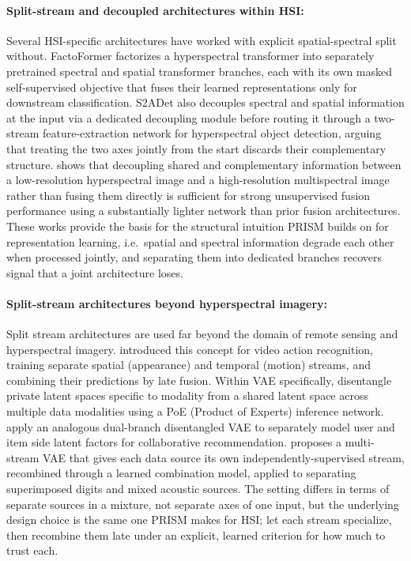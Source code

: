 \documentclass[twoside,11pt]{article}
\begin{document}
\paragraph{Split-stream and decoupled architectures within HSI:}
Several HSI-specific architectures have worked with explicit spatial-spectral split without. FactoFormer \citep{mohamed2023factoformer} factorizes a hyperspectral transformer into separately pretrained spectral and spatial transformer branches, each with its own masked self-supervised objective that fuses their learned representations only for downstream classification. S2ADet \citep{he2023s2adet} also decouples spectral and spatial information at the input via a dedicated decoupling module before routing it through a two-stream feature-extraction network for hyperspectral object detection, arguing that treating the two axes jointly from the start discards their complementary structure. \citet{du2024modality} shows that decoupling shared and complementary information between a low-resolution hyperspectral image and a high-resolution multispectral image rather than fusing them directly is sufficient for strong unsupervised fusion performance using a substantially lighter network than prior fusion architectures. These works provide the basis for the structural intuition PRISM builds on for representation learning, i.e.\ spatial and spectral information degrade each other when processed jointly, and separating them into dedicated branches recovers signal that a joint architecture loses.

\paragraph{Split-stream architectures beyond hyperspectral imagery:}
Split stream architectures are used far beyond the domain of remote sensing and hyperspectral imagery. \citet{simonyan2014twostream} introduced this concept for video action recognition, training separate spatial (appearance) and temporal (motion) streams, and combining their predictions by late fusion. Within VAE specifically, \citet{lee2021privateshared} disentangle private latent spaces specific to modality from a shared latent space across multiple data modalities using a PoE (Product of Experts) inference network. \citet{guo2024dualvae} apply an analogous dual-branch disentangled VAE to separately model user and item side latent factors for collaborative recommendation. \citep{boukun2025multistream} proposes a multi-stream VAE that gives each data source its own independently-supervised stream, recombined through a learned combination model, applied to separating superimposed digits and mixed acoustic sources. The setting differs in terms of separate sources in a mixture, not separate axes of one input, but the underlying design choice is the same one PRISM makes for HSI; let each stream specialize, then recombine them late under an explicit, learned criterion for how much to trust each.
\end{document}
